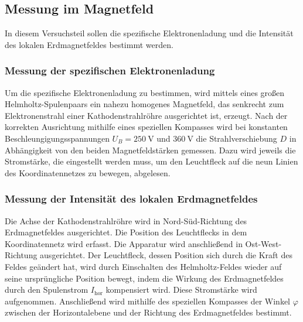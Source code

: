 \subsection{Messung im Magnetfeld}
In diesem Versuchsteil sollen die spezifische Elektronenladung
und die Intensität des lokalen Erdmagnetfeldes bestimmt werden.

\subsubsection{Messung der spezifischen Elektronenladung}
Um die spezifische Elektronenladung zu bestimmen, wird mittels 
eines großen Helmholtz-Spulenpaars ein nahezu homogenes 
Magnetfeld, das senkrecht zum Elektronenstrahl einer 
Kathodenstrahlröhre ausgerichtet ist, erzeugt.
Nach der korrekten Ausrichtung mithilfe eines speziellen
Kompasses wird bei konstanten
Beschleungigungsspannungen $U_B = \SI{250}{\volt}$ und 
$\SI{360}{\volt}$ die Strahlverschiebung $D$ in Abhängigkeit 
von den beiden Magnetfeldstärken gemessen. Dazu wird jeweils die
Stromstärke, die eingestellt werden muss, um den Leuchtfleck
auf die neun Linien des Koordinatennetzes zu bewegen,
abgelesen.

\subsubsection{Messung der Intensität des lokalen Erdmagnetfeldes}
Die Achse der Kathodenstrahlröhre wird in Nord-Süd-Richtung
des Erdmagnetfeldes ausgerichtet. Die Position des Leuchtflecks 
in dem Koordinatennetz wird erfasst.
Die Apparatur wird anschließend in Ost-West-Richtung ausgerichtet.
Der Leuchtfleck, dessen Position sich durch die Kraft des
Feldes geändert hat, wird durch Einschalten des Helmholtz-Feldes
wieder auf seine ursprüngliche Position bewegt, indem die Wirkung
des Erdmagnetfeldes durch den Spulenstrom $I_\text{hor}$ kompensiert
wird. Diese Stromstärke wird aufgenommen.
Anschließend wird mithilfe des speziellen Kompasses der Winkel
$\varphi$ zwischen der Horizontalebene und der Richtung des
Erdmagnetfeldes bestimmt.